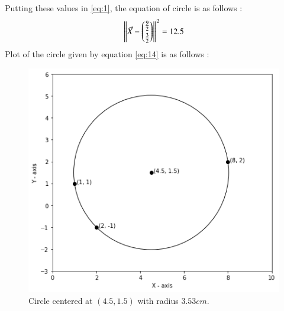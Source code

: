 \documentclass[journal,12pt,twocolumn]{IEEEtran}
\begin{document}
Putting these values in \eqref{eq:1}, the equation of circle is as follows : 
\begin{align}
\left\lVert\Vec{X}-\begin{pmatrix}\frac{9}{2}\\[0.1cm]\frac{3}{2}\end{pmatrix}\right\rVert^2=12.5\label{eq:14}
\end{align}
Plot of the circle given by equation \eqref{eq:14} is as follows :
\begin{figure}[h]
\centering
    \includegraphics[width=\columnwidth]{circle2.png}
    \caption{Circle centered at $(4.5, 1.5)$ with radius $3.53cm$.}
    \label{circle}
\end{figure}
\end{document}

